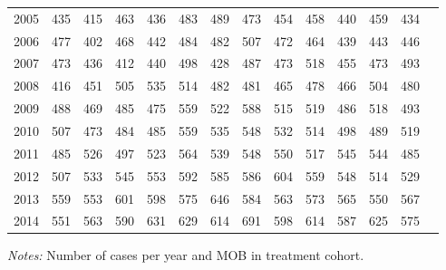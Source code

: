\begin{table}[H]
\begin{threeparttable}
{\begin{tabular}{l*{13}{c}}
2005        &         435&         415&         463&         436&         483&         489&         473&         454&         458&         440&         459&         434\\
2006        &         477&         402&         468&         442&         484&         482&         507&         472&         464&         439&         443&         446\\
2007        &         473&         436&         412&         440&         498&         428&         487&         473&         518&         455&         473&         493\\
2008        &         416&         451&         505&         535&         514&         482&         481&         465&         478&         466&         504&         480\\
2009        &         488&         469&         485&         475&         559&         522&         588&         515&         519&         486&         518&         493\\
2010        &         507&         473&         484&         485&         559&         535&         548&         532&         514&         498&         489&         519\\
2011        &         485&         526&         497&         523&         564&         539&         548&         550&         517&         545&         544&         485\\
2012        &         507&         533&         545&         553&         592&         585&         586&         604&         559&         548&         514&         529\\
2013        &         559&         553&         601&         598&         575&         646&         584&         563&         573&         565&         550&         567\\
2014        &         551&         563&         590&         631&         629&         614&         691&         598&         614&         587&         625&         575\\
 \bottomrule \end{tabular} } \begin{tablenotes} \item \scriptsize \emph{Notes:} Number of cases per year and MOB in treatment cohort. \end{tablenotes} \end{threeparttable} \end{table} 
